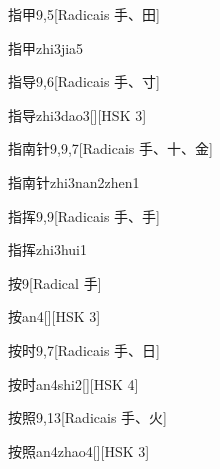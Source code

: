 \begin{entry}{指甲}{9,5}[Radicais ⼿、⽥]
  \begin{phonetics}{指甲}{zhi3jia5}
  \end{phonetics}
\end{entry}

\begin{entry}{指导}{9,6}[Radicais ⼿、⼨]
  \begin{phonetics}{指导}{zhi3dao3}[][HSK 3]
  \end{phonetics}
\end{entry}

\begin{entry}{指南针}{9,9,7}[Radicais ⼿、⼗、⾦]
  \begin{phonetics}{指南针}{zhi3nan2zhen1}
  \end{phonetics}
\end{entry}

\begin{entry}{指挥}{9,9}[Radicais ⼿、⼿]
  \begin{phonetics}{指挥}{zhi3hui1}
  \end{phonetics}
\end{entry}

\begin{entry}{按}{9}[Radical ⼿]
  \begin{phonetics}{按}{an4}[][HSK 3]
  \end{phonetics}
\end{entry}

\begin{entry}{按时}{9,7}[Radicais ⼿、⽇]
  \begin{phonetics}{按时}{an4shi2}[][HSK 4]
  \end{phonetics}
\end{entry}

\begin{entry}{按照}{9,13}[Radicais ⼿、⽕]
  \begin{phonetics}{按照}{an4zhao4}[][HSK 3]
  \end{phonetics}
\end{entry}

